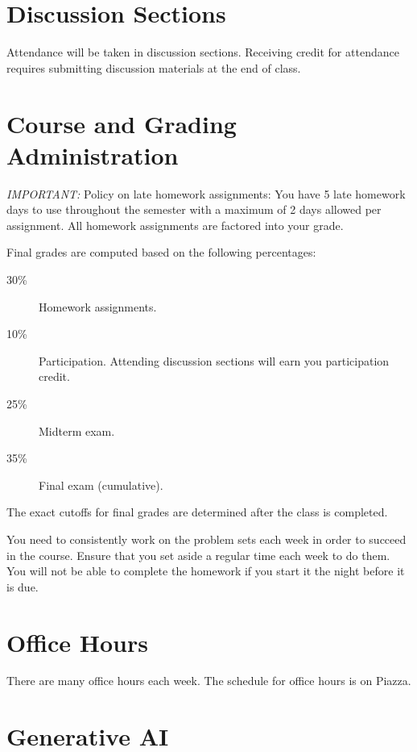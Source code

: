 \documentclass[11pt]{article}
\begin{document}
\section*{Discussion Sections}

Attendance will be taken in discussion sections. Receiving credit for
attendance requires submitting discussion materials at the end of class.

\section*{Course and Grading Administration}

\emph{IMPORTANT:} Policy on late homework assignments: You have 5 late homework days to use throughout the semester with a maximum of 2 days allowed per assignment. All homework assignments are factored into your grade.

Final grades are computed based on the following percentages:
\begin{description}
\item[30\%] Homework assignments.
\item[10\%] Participation. Attending discussion sections will earn you participation credit.
\item[25\%] Midterm exam.
\item[35\%] Final exam (cumulative).
\end{description}

The exact cutoffs for final grades are determined after the class is completed.

You need to consistently work on the problem sets each week in order to succeed in the course. Ensure that you set aside a regular time each week to do them. You will not be able to complete the homework if you start it the night before it is due.

\section*{Office Hours}

There are many office hours each week. The schedule for office hours is
on Piazza.


\newpage

\section*{Generative AI}
\end{document}
